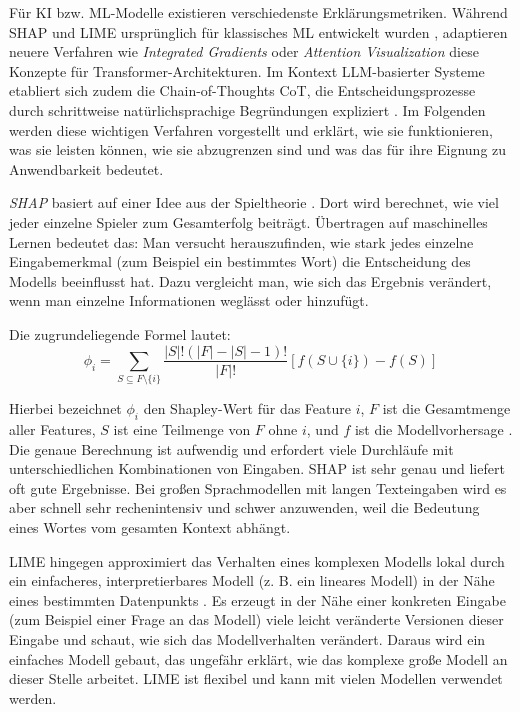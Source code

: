     Für \acs{KI} bzw. \acs{ML}-Modelle existieren verschiedenste Erklärungsmetriken.
    Während \ac{SHAP} und \ac{LIME} ursprünglich für klassisches \acs{ML} entwickelt wurden \autocite[S. 1]{lundberg2017}, adaptieren neuere Verfahren wie \textit{Integrated Gradients} \autocite[S. 1]{sundararajan2017} oder \textit{Attention Visualization} \autocite[S. 1]{abnar2020} diese Konzepte für Transformer-Architekturen.
    Im Kontext \acs{LLM}-basierter Systeme etabliert sich zudem die Chain-of-Thoughts \ac{CoT}, die Entscheidungsprozesse durch schrittweise natürlichsprachige Begründungen expliziert \autocite[S. 1 und 2]{wei2022}.
    Im Folgenden werden diese wichtigen Verfahren vorgestellt und erklärt, wie sie funktionieren, was sie leisten können, wie sie abzugrenzen sind und was das für ihre Eignung zu Anwendbarkeit bedeutet.


    \textit{\acs{SHAP}} basiert auf einer Idee aus der Spieltheorie \autocite[S. 4-8]{lundberg2017}.
    Dort wird berechnet, wie viel jeder einzelne Spieler zum Gesamterfolg beiträgt.
    Übertragen auf maschinelles Lernen bedeutet das: Man versucht herauszufinden, wie stark jedes einzelne Eingabemerkmal (zum Beispiel ein bestimmtes Wort) die Entscheidung des Modells beeinflusst hat.
    Dazu vergleicht man, wie sich das Ergebnis verändert, wenn man einzelne Informationen weglässt oder hinzufügt.

    Die zugrundeliegende Formel lautet:
    \begin{equation}
    \phi_i = \sum_{S \subseteq F \setminus \{i\}} \frac{|S|! (|F| - |S| - 1)!}{|F|!} \left[ f(S \cup \{i\}) - f(S) \right]
    \end{equation}

    Hierbei bezeichnet \( \phi_i \) den Shapley-Wert für das Feature \( i \), \( F \) ist die Gesamtmenge aller Features, \( S \) ist eine Teilmenge von \( F \) ohne \( i \), und \( f \) ist die Modellvorhersage \autocite[S. 4-8]{lundberg2017}.
    Die genaue Berechnung ist aufwendig und erfordert viele Durchläufe mit unterschiedlichen Kombinationen von Eingaben.
    \acs{SHAP} ist sehr genau und liefert oft gute Ergebnisse.
    Bei großen Sprachmodellen mit langen Texteingaben wird es aber schnell sehr rechenintensiv und schwer anzuwenden, weil die Bedeutung eines Wortes vom gesamten Kontext abhängt.

    \acs{LIME} hingegen approximiert das Verhalten eines komplexen Modells lokal durch ein einfacheres, interpretierbares Modell (z. B. ein lineares Modell) in der Nähe eines bestimmten Datenpunkts \autocite[S. 2 und 3]{lundberg2017}.
    Es erzeugt in der Nähe einer konkreten Eingabe (zum Beispiel einer Frage an das Modell) viele leicht veränderte Versionen dieser Eingabe und schaut, wie sich das Modellverhalten verändert. Daraus wird ein einfaches Modell gebaut, das ungefähr erklärt, wie das komplexe große Modell an dieser Stelle arbeitet.
    \acs{LIME} ist flexibel und kann mit vielen Modellen verwendet werden.

